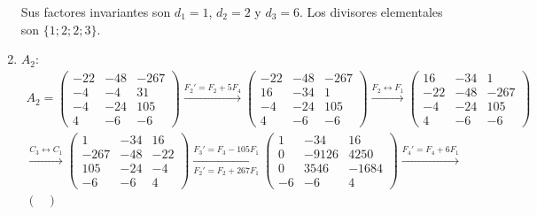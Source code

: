 \begin{ejercicio}
\begin{enumerate}
        Sus factores invariantes son $d_1=1$, $d_2=2$ y $d_3=6$.
        Los divisores elementales son $\{1; 2; 2; 3\}$.

        \item $A_2$:
        \begin{multline*}
            A_2 = \begin{pmatrix}
                -22 & -48 & -267 \\
                -4 & -4 & 31 \\
                -4 & -24 & 105 \\
                4 & -6 & -6
            \end{pmatrix}
            \xrightarrow{F_2'=F_2+5F_4}
            \begin{pmatrix}
                -22 & -48 & -267 \\
                16 & -34 & 1 \\
                -4 & -24 & 105 \\
                4 & -6 & -6
            \end{pmatrix}
            \xrightarrow{F_2\leftrightarrow F_1}
            \begin{pmatrix}
                16 & -34 & 1 \\
                -22 & -48 & -267 \\
                -4 & -24 & 105 \\
                4 & -6 & -6
            \end{pmatrix}\\
            \xrightarrow{C_3\leftrightarrow C_1}
            \begin{pmatrix}
                1 & -34 & 16 \\
                -267 & -48 & -22 \\
                105 & -24 & -4 \\
                -6 & -6 & 4
            \end{pmatrix}
            \xrightarrow[F_2'=F_2+267F_1]{F_3'=F_3-105F_1}
            \begin{pmatrix}
                1 & -34 & 16 \\
                0 & -9126 & 4250 \\
                0 & 3546 & -1684 \\
                -6 & -6 & 4
            \end{pmatrix}
            \xrightarrow{F_4'=F_4+6F_1}\\
            \begin{pmatrix}

\end{pmatrix}
\end{multline*}
\end{enumerate}
\end{ejercicio}
